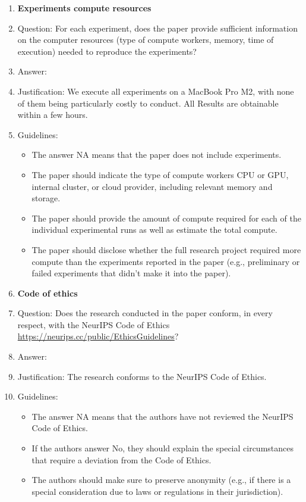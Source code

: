 \documentclass{article}
\theoremstyle{plain}
\theoremstyle{definition}
\theoremstyle{remark}
\begin{document}
\begin{enumerate}
\item {\bf Experiments compute resources}
    \item[] Question: For each experiment, does the paper provide sufficient information on the computer resources (type of compute workers, memory, time of execution) needed to reproduce the experiments?
    \item[] Answer: \answerYes{} %
    \item[] Justification: We execute all experiments on a MacBook Pro M2, with none of them being particularly costly to conduct. All Results are obtainable within a few hours.
    \item[] Guidelines:
    \begin{itemize}
        \item The answer NA means that the paper does not include experiments.
        \item The paper should indicate the type of compute workers CPU or GPU, internal cluster, or cloud provider, including relevant memory and storage.
        \item The paper should provide the amount of compute required for each of the individual experimental runs as well as estimate the total compute. 
        \item The paper should disclose whether the full research project required more compute than the experiments reported in the paper (e.g., preliminary or failed experiments that didn't make it into the paper). 
    \end{itemize}
    
\item {\bf Code of ethics}
    \item[] Question: Does the research conducted in the paper conform, in every respect, with the NeurIPS Code of Ethics \url{https://neurips.cc/public/EthicsGuidelines}?
    \item[] Answer: \answerYes{} %
    \item[] Justification: The research conforms to the NeurIPS Code of Ethics. 
    \item[] Guidelines:
    \begin{itemize}
        \item The answer NA means that the authors have not reviewed the NeurIPS Code of Ethics.
        \item If the authors answer No, they should explain the special circumstances that require a deviation from the Code of Ethics.
        \item The authors should make sure to preserve anonymity (e.g., if there is a special consideration due to laws or regulations in their jurisdiction).
    \end{itemize}



\end{enumerate}
\end{document}

